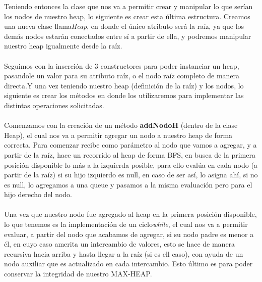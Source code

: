 \documentclass{report}
\begin{document}
Teniendo entonces la clase que nos va a permitir crear y manipular lo que serían los nodos de nuestro heap, lo siguiente es crear esta última estructura. Creamos una nueva clase llama\textit{Heap}, en donde el único atributo será la raíz, ya que los demás nodos estarán conectados entre sí a partir de ella, y podremos manipular nuestro heap igualmente desde la raíz.\\\\
Seguimos con la inserción de 3 constructores para poder instanciar un heap, pasandole un valor para su atributo raíz, o el nodo raíz completo de manera directa.Y una vez teniendo nuestro heap (definición de la raíz) y los nodos, lo siguiente es crear los métodos en donde los utilizaremos para implementar las distintas operaciones solicitadas.\\\\
Comenzamos con la creación de un método \textbf{addNodoH} (dentro de la clase Heap), el cual nos va a permitir agregar un nodo a nuestro heap de forma correcta. Para comenzar recibe como parámetro al nodo que vamos a agregar, y a partir de la raíz, hace un recorrido al heap de forma BFS, en busca de la primera posición disponible lo más a la izquierda posible, para ello evalúa en cada nodo (a partir de la raíz) si su hijo izquierdo es null, en caso de ser así, lo asigna ahí, si no es null, lo agregamos a una queue y pasamos a la misma evaluación pero para el hijo derecho del nodo.\\\\
Una vez que nuestro nodo fue agregado al heap en la primera posición disponible, lo que tenemos es la implementación de un ciclo\textit{while}, el cual nos va a permitir evaluar, a partir del nodo que acabamos de agregar, si su nodo padre es menor a él, en cuyo caso amerita un intercambio de valores, esto se hace de manera recursiva hacia arriba y hasta llegar a la raíz (si es ell caso), con ayuda de un nodo auxiliar que es actualizado en cada intercambio. Esto último es para poder conservar la integridad de nuestro MAX-HEAP.\\\\
\end{document}
